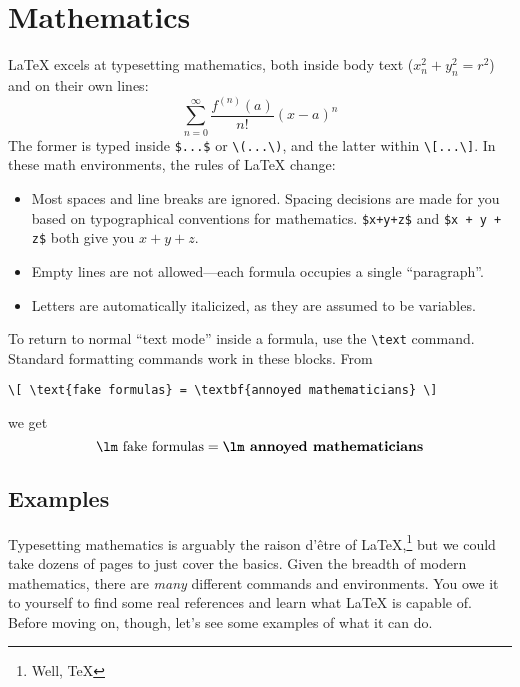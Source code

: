 \chapter{Mathematics}
\label{math}

\LaTeX{} excels at typesetting mathematics, both inside body text
($x_n^2+y_n^2=r^2$) and on their own lines:
\[\sum_{n=0}^{\infty} \frac{f^{(n)} (a)}{n!} (x - a)^n\]
The former is typed inside \verb|$...$| or \verb|\(...\)|,
and the latter within \verb|\[...\]|.
In these math environments, the rules of \LaTeX{} change:
\begin{itemize}
\item Most spaces and line breaks are ignored.
    Spacing decisions are made for you based on
    typographical conventions for mathematics.
    \verb|$x+y+z$| and \verb|$x + y + z$| both give you $x+y+z$.
\item Empty lines are not allowed---each formula occupies a single
    ``paragraph''\quotekern.
\item Letters are automatically italicized, as they are assumed to be variables.
\end{itemize}
To return to normal ``text mode'' inside a formula, use the \verb|\text| command.
Standard formatting commands work in these blocks.
From
\begin{leftfigure}
\begin{lstlisting}
\[ \text{fake formulas} = \textbf{annoyed mathematicians} \]
\end{lstlisting}
\end{leftfigure}
we get
\[ \text{\lm fake formulas} = \textbf{\lm annoyed mathematicians} \]

\section{Examples}

Typesetting mathematics is arguably the raison d'être of
\LaTeX,\punckern\footnote{Well, \TeX} but we could
take dozens of pages to just cover the basics.
Given the breadth of modern mathematics,
there are \emph{many} different commands and environments.
You owe it to yourself to find some real references and learn what \LaTeX{}
is capable of.
Before moving on, though, let's see some examples of what it can do.
\newpage


